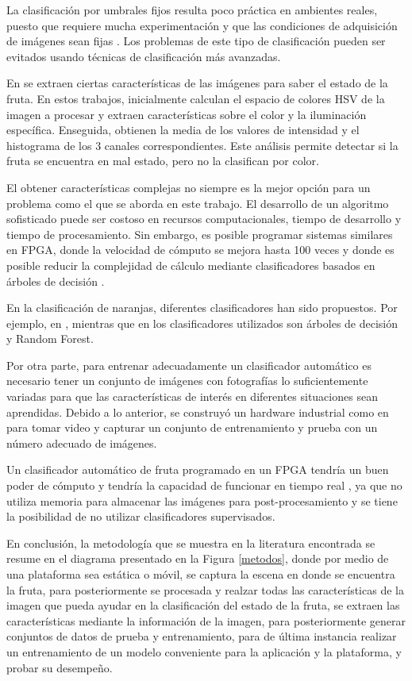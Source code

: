 \documentclass[twoside,spanish,ESP,MSc]{plantillaLabUPV}
\theoremstyle{definition}
\begin{document}
La clasificación por umbrales fijos resulta poco práctica en ambientes reales, puesto que requiere mucha experimentación y que las condiciones de adquisición de imágenes sean fijas \cite{huehue,josu}. Los problemas de este tipo de clasificación pueden ser evitados usando técnicas de clasificación más avanzadas.

En \cite{analis,chokun} se extraen ciertas características de las imágenes para saber el estado de la fruta. En estos trabajos, inicialmente calculan el espacio de colores HSV de la imagen a procesar y extraen características sobre el color y la iluminación específica. Enseguida, obtienen la media de los valores de intensidad y el histograma de los 3 canales correspondientes. Este análisis permite detectar si la fruta se encuentra en mal estado, pero no la clasifican por color.

El obtener características complejas no siempre es la mejor opción para un problema como el que se aborda en este trabajo. El desarrollo de un algoritmo sofisticado puede ser costoso en recursos computacionales, tiempo de desarrollo y tiempo de procesamiento\cite{khoje}. Sin embargo, es posible programar sistemas similares en FPGA, donde la velocidad de cómputo se mejora hasta 100 veces \cite{faste} y donde es posible reducir la complejidad de cálculo mediante clasificadores basados en árboles de decisión \cite{friend}.

En la clasificación de naranjas, diferentes clasificadores han sido propuestos. Por ejemplo, en \cite{classi,analis}, mientras que en \cite{analis,rfrf} los clasificadores utilizados son árboles de decisión y Random Forest. 

Por otra parte, para entrenar adecuadamente un clasificador automático es necesario tener un conjunto de imágenes con fotografías lo suficientemente variadas para que las características de interés en diferentes situaciones sean aprendidas. Debido a lo anterior, se construyó un hardware industrial como en \cite{machineorang,machinefruit} para tomar video y capturar un conjunto de entrenamiento y prueba con un número adecuado de imágenes.

Un clasificador automático de fruta programado en un FPGA tendría un buen poder de cómputo y tendría la capacidad de funcionar en tiempo real \cite{josu}, ya que no utiliza memoria para almacenar las imágenes para post-procesamiento y se tiene la posibilidad de no utilizar clasificadores supervisados.

En conclusión, la metodología que se muestra en la literatura encontrada se resume en el diagrama presentado en la Figura \ref{metodos}, donde por medio de una plataforma sea estática o móvil, se captura la escena en donde se encuentra la fruta, para posteriormente se procesada y realzar todas las características de la imagen que pueda ayudar en la clasificación del estado de la fruta, se extraen las características mediante la información de la imagen, para posteriormente generar conjuntos de datos de prueba y entrenamiento, para de última instancia realizar un entrenamiento de un modelo conveniente para la aplicación y la plataforma, y probar su desempeño. 
\end{document}

